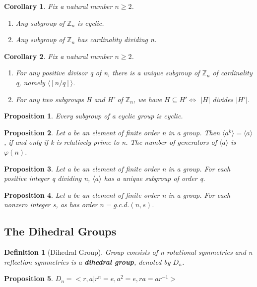 \documentclass[12pt]{article}
\newtheorem{definition}{Definition}[subsection]
\newtheorem{proposition}{Proposition}[subsection]
\newtheorem{corollary}{Corollary}[subsection]
\begin{document}
    \begin{corollary}
        Fix a natural number $n \geq 2$.
        \begin{enumerate}
            \item Any subgroup of $\mathbb{Z}_n$ is cyclic.
            \item Any subgroup of $\mathbb{Z}_n$ has cardinality dividing n.
        \end{enumerate}

    \end{corollary}
    \begin{corollary}
        Fix a natural number $n \geq 2$.
        \begin{enumerate}
            \item For any positive divisor q of n, there is a unique subgroup of $\mathbb{Z}_n$ of cardinality q, namely $\langle [n/q] \rangle$.
            \item     For any two subgroups H and H' of $\mathbb{Z}_n$, we have $H \subseteq H' \Leftrightarrow$ $|H|$ divides $|H'|$.
        \end{enumerate}
    \end{corollary}

    \begin{proposition}
            Every subgroup of a cyclic group is cyclic.
    \end{proposition}
    \begin{proposition}
        Let a be an element of finite order n in a group. Then $\langle a^k \rangle = \langle a \rangle$, if and only if k is relatively prime to n. The number of generators of $\langle a \rangle$ is $\varphi(n)$.
    \end{proposition}
    \begin{proposition}
        Let a be an element of finite order n in a group. For each positive integer q dividing n, $\langle a \rangle$ has a unique subgroup of order q.
    \end{proposition}
    \begin{proposition}
        Let a be an element of finite order n in a group. For each nonzero integer s, as has order $n=g.c.d.(n, s)$.
    \end{proposition}
\subsection{The Dihedral Groups}
    \begin{definition}[Dihedral Group]
        Group consists of n rotational symmetries and n reflection symmetries is a \textbf{dihedral group}, denoted by $D_n$.
    \end{definition}
	\begin{proposition}
		$D_n = <r, a | r^n = e, a^2 = e, ra = ar^{-1}>$ 
	\end{proposition}
\end{document}
